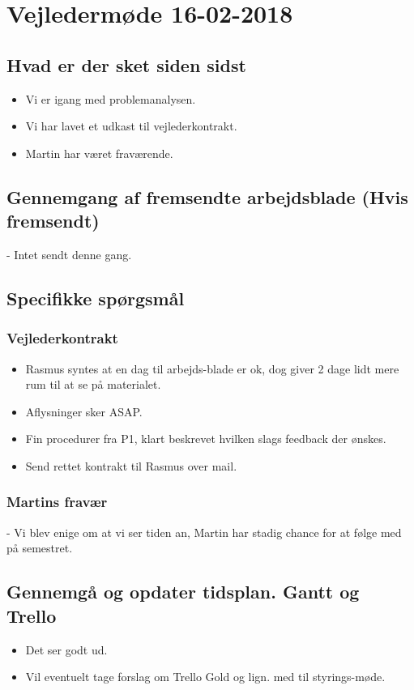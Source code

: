 \newpage
\section{Vejledermøde 16-02-2018}
\subsection{Hvad er der sket siden sidst}
    \begin{itemize}
        \item Vi er igang med problemanalysen.
        \item Vi har lavet et udkast til vejlederkontrakt.
        \item Martin har været fraværende.
    \end{itemize}
\subsection{Gennemgang af fremsendte arbejdsblade (Hvis fremsendt)}
- Intet sendt denne gang.

\subsection{Specifikke spørgsmål}
\subsubsection{Vejlederkontrakt}
    \begin{itemize}
        \item Rasmus syntes at en dag til arbejds-blade er ok, dog giver 2 dage lidt mere rum til at se på materialet.
        \item Aflysninger sker ASAP.
        \item Fin procedurer fra P1, klart beskrevet hvilken slags feedback der ønskes.
        \item Send rettet kontrakt til Rasmus over mail.
    \end{itemize}
\subsubsection{Martins fravær}
- Vi blev enige om at vi ser tiden an, Martin har stadig chance for at følge med på semestret.

\subsection{Gennemgå og opdater tidsplan. Gantt og Trello}
    \begin{itemize}
        \item Det ser godt ud.
        \item Vil eventuelt tage forslag om Trello Gold og lign. med til styrings-møde.
    \end{itemize}
